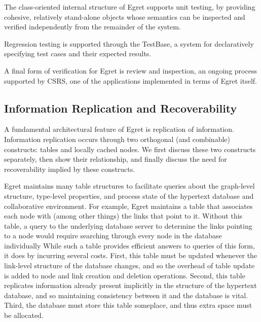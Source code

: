 The class-oriented internal structure of Egret supports unit testing,
by providing cohesive, relatively stand-alone objects whose semantics
can be inspected and verified independently from the remainder of the
system.

Regression testing is supported through the TestBase, a system for
declaratively specifying test cases and their expected results.

A final form of verification for Egret is review and inspection, an
ongoing process supported by CSRS, one of the applications implemented
in terms of Egret itself.

\subsection{Information Replication and Recoverability}

A fundamental architectural feature of Egret is replication of  information. 
Information replication occurs through two orthogonal (and combinable)
constructs:  tables and locally cached nodes.  We first discuss these
two constructs separately, then show their relationship, and finally
discuss the need for recoverability implied by these constructs.

Egret maintains many table structures to facilitate queries about the
graph-level structure, type-level properties, and process state of the
hypertext database and collaborative environment.  For example, Egret
maintains a table that associates each node with (among other things)
the links that point to it.  Without this table, a query to the
underlying database server to determine the links pointing to a node
would require searching through every node in the database
individually While such a table provides efficient answers
to queries of this form, it does by incurring several costs.  First,
this table must be updated whenever the link-level structure of the
database changes, and so the overhead of table update is added to node
and link creation and deletion operations.  Second, this table
replicates information already present implicitly in the structure of
the hypertext database, and so maintaining consistency between it and
the database is vital.  Third, the database must store this table
someplace, and thus extra space must be allocated.

